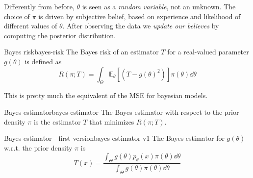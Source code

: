 \documentclass[12pt]{extarticle}
\newcommand{\E}{\mathds{E}}
\begin{document}
Differently from before, $\theta$ is seen as a \emph{random variable}, not an unknown.
The choice of $\pi$ is driven by subjective belief, based on experience and likelihood of different values of $\theta$.
After observing the data we \emph{update our believes} by computing the posterior distribution.

\begin{definition}{Bayes risk}{bayes-risk}
    The Bayes risk of an estimator $T$ for a real-valued parameter $g(\theta)$ is defined as
    \begin{equation}
        R(\pi; T) = \int_\Theta \E_\theta[(T-g(\theta)^2)] \pi(\theta) \dd{\theta}
    \end{equation}
\end{definition}
This is pretty much the equivalent of the MSE for bayesian models.

\begin{definition}{Bayes estimator}{bayes-estimator}
    The Bayes estimator with respect to the prior density $\pi$ is the estimator $T$ that minimizes $R(\pi; T)$.
\end{definition}

\begin{theorem}{Bayes estimator - first version}{bayes-estimator-v1}
    The Bayes estimator for $g(\theta)$ w.r.t. the prior density $\pi$ is
    \begin{equation}
        T(x) = \frac{\int_\Theta g(\theta) p_\theta(x)\pi(\theta) \dd{\theta}}{\int_\Theta g(\theta) \pi(\theta) \dd{\theta}}
    \end{equation}
\end{theorem}
\end{document}
